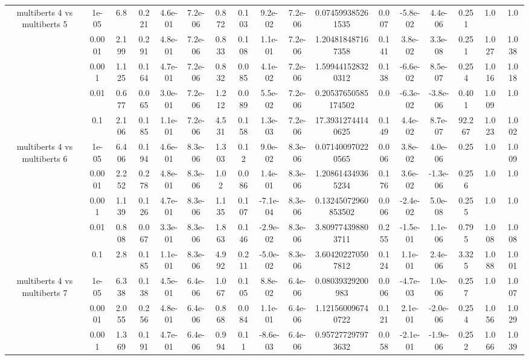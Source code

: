 \begin{tabular}{|c|c|c|c|c|c|c|c|c|c|c|c|c|c|c|c|c|}
\hline
\multirow{5}{*}{multiberts 4 vs multiberts 5} & 1e-05 & 6.8 & 0.221 & 4.6e-01 & 7.2e-06 & 0.872 & 0.103 & 9.2e-02 & 7.2e-06 & 0.074599385261535 & 0.007 & -5.8e-02 & 4.4e-06 & 0.251 & 1.0 & 1.0 \\
 & 0.0001 & 2.199 & 0.291 & 4.8e-01 & 7.2e-06 & 0.833 & 0.108 & 1.1e-01 & 7.2e-06 & 1.204818487167358 & 0.141 & 3.8e-02 & 3.3e-08 & 0.251 & 1.027 & 1.038 \\
 & 0.001 & 1.125 & 0.164 & 4.7e-01 & 7.2e-06 & 0.832 & 0.085 & 4.1e-02 & 7.2e-06 & 1.599441528320312 & 0.138 & -6.6e-02 & 8.5e-07 & 0.254 & 1.016 & 1.018 \\
 & 0.01 & 0.677 & 0.065 & 3.0e-01 & 7.2e-06 & 1.212 & 0.089 & 5.5e-02 & 7.2e-06 & 0.20537650585174502 & 0.0 & -6.3e-02 & -3.8e-06 & 0.401 & 1.009 & 1.0 \\
 & 0.1 & 2.106 & 0.185 & 1.1e-01 & 7.2e-06 & 4.531 & 0.158 & 1.3e-03 & 7.2e-06 & 17.39312744140625 & 0.149 & 4.4e-02 & 8.7e-07 & 92.267 & 1.023 & 1.002 \\
\hline
\multirow{5}{*}{multiberts 4 vs multiberts 6} & 1e-05 & 6.406 & 0.194 & 4.6e-01 & 8.3e-06 & 1.303 & 0.12 & 9.0e-02 & 8.3e-06 & 0.071400970220565 & 0.006 & 3.8e-02 & 4.0e-06 & 0.25 & 1.0 & 1.009 \\
 & 0.0001 & 2.252 & 0.278 & 4.8e-01 & 8.3e-06 & 1.02 & 0.086 & 1.4e-01 & 8.3e-06 & 1.208614349365234 & 0.176 & 3.6e-02 & -1.3e-06 & 0.256 & 1.0 & 1.0 \\
 & 0.001 & 1.139 & 0.126 & 4.7e-01 & 8.3e-06 & 1.135 & 0.107 & -7.1e-04 & 8.3e-06 & 0.13245072960853502 & 0.006 & -2.4e-02 & 5.0e-08 & 0.255 & 1.0 & 1.0 \\
 & 0.01 & 0.808 & 0.067 & 3.3e-01 & 8.3e-06 & 1.863 & 0.146 & -2.9e-02 & 8.3e-06 & 3.809774398803711 & 0.255 & -1.5e-01 & 1.1e-06 & 0.795 & 1.008 & 1.008 \\
 & 0.1 & 2.8 & 0.185 & 1.1e-01 & 8.3e-06 & 4.992 & 0.211 & -5.0e-02 & 8.3e-06 & 3.604202270507812 & 0.124 & 1.1e-01 & 2.4e-06 & 3.325 & 1.088 & 1.001 \\
\hline
\multirow{5}{*}{multiberts 4 vs multiberts 7} & 1e-05 & 6.338 & 0.138 & 4.5e-01 & 6.4e-06 & 1.067 & 0.105 & 8.8e-02 & 6.4e-06 & 0.08039329200983 & 0.006 & -4.7e-03 & 1.0e-06 & 0.257 & 1.0 & 1.007 \\
 & 0.0001 & 2.055 & 0.256 & 4.8e-01 & 6.4e-06 & 0.868 & 0.084 & 1.1e-01 & 6.4e-06 & 1.121560096740722 & 0.121 & 2.1e-01 & -2.0e-06 & 0.254 & 1.056 & 1.029 \\
 & 0.001 & 1.369 & 0.191 & 4.7e-01 & 6.4e-06 & 0.994 & 0.11 & -8.6e-03 & 6.4e-06 & 0.957277297973632 & 0.058 & -2.1e-01 & -1.9e-06 & 0.252 & 1.066 & 1.039 \\

\end{tabular}
